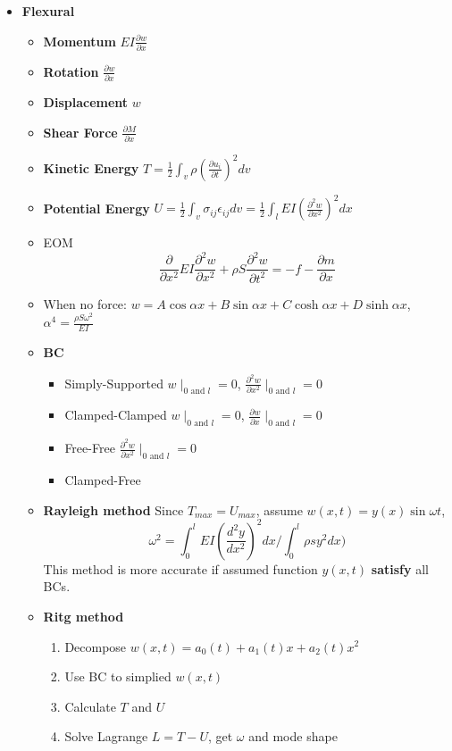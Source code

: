 \documentclass{article}
\begin{document}
\begin{multicols*}{2}
\begin{itemize}
  \item\textbf{Flexural}
    \begin{itemize}
    \item \textbf{Momentum} $EI\frac{\partial w}{\partial x}$
    \item \textbf{Rotation} $\frac{\partial w}{\partial x}$
    \item \textbf{Displacement} $w$
    \item \textbf{Shear Force} $\frac{\partial M}{\partial x}$
    \item \textbf{Kinetic Energy} $T = \frac{1}{2}\int_v\rho (\frac{\partial u_i}{\partial t})^2 dv$
    \item \textbf{Potential Energy} $U = \frac{1}{2} \int_v \sigma_{ij} \epsilon_{ij} dv = \frac{1}{2} \int_l EI(\frac{\partial^2 w}{\partial x^2})^2 dx$
    \item EOM
      \begin{equation*}
        \frac{\partial}{\partial x^2} EI\frac{\partial^2 w}{\partial x^2} + \rho S \frac{\partial^2 w}{\partial t^2} = -f - \frac{\partial m}{\partial x}
      \end{equation*}
    \item When no force: $w = A\cos\alpha x + B\sin\alpha x + C\cosh\alpha x + D\sinh\alpha x$, $\alpha^4 = \frac{\rho S \omega^2}{EI}$
    \item \textbf{BC}
      \begin{itemize}
      \item Simply-Supported $w \mid_{0 \text{ and } l} = 0$, $\frac{\partial^2 w}{\partial x^2} \mid_{0 \text{ and } l} = 0$
      \item Clamped-Clamped $w \mid_{0 \text{ and } l} = 0$, $\frac{\partial w}{\partial x} \mid_{0 \text{ and } l} = 0$
      \item Free-Free $\frac{\partial^2 w}{\partial x^2} \mid_{0 \text{ and } l} = 0$
      \item Clamped-Free
      \end{itemize}
    \item \textbf{Rayleigh method} Since $T_{max} = U_{max}$, assume $w(x,t) = y(x) \sin\omega t$,
      \begin{equation*}
        \omega^2 = \int_0^l EI(\frac{d^2y}{dx^2})^2 dx / \int_0^l \rho s y^2 dx)
      \end{equation*}
      This method is more accurate if assumed function $y(x,t)$ \textbf{satisfy} all BCs.

    \item \textbf{Ritg method}
      \begin{enumerate}
      \item Decompose $w(x,t) = a_0(t) + a_1(t)x + a_2(t)x^2$
      \item Use BC to simplied $w(x,t)$
      \item Calculate $T$ and $U$
      \item Solve Lagrange $L = T - U$, get $\omega$ and mode shape
      \end{enumerate}
    \end{itemize}
  \end{itemize}



\end{multicols*}
\end{document}
